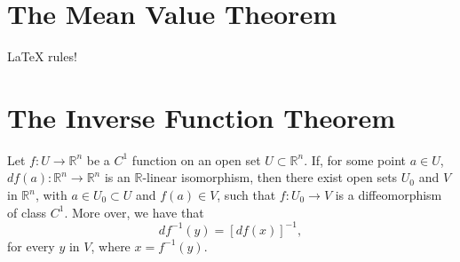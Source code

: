 \section{The Mean Value Theorem}\label{sec:the_mean_value_theorem}

\begin{theorem}\label{thm:the-mean-value-theorem}
  \LaTeX{} rules!
\end{theorem}

\section{The Inverse Function Theorem}\label{sec:the_inverse_function_theorem}

\begin{theorem}\label{thm:the-inverse-function-theorem}
  Let \(f:U\to\mathbb{R}^{n}\) be a \(C^{1}\) function on an open set \({U}\subset{\mathbb{R}^{n}}\). If, for some point \({a}\in{U}\), \(df(a):\mathbb{R}^{n}\to\mathbb{R}^{n}\) is an \(\mathbb{R}\)-linear isomorphism, then there exist open sets \(U_{0}\) and \(V\) in \(\mathbb{R}^{n}\), with \({a}\in{U_{0}}\subset{U}\) and \({f(a)}\in{V}\), such that \(f:U_{0}\to{V}\) is a diffeomorphism of class \(C^{1}\). More over, we have that
  \[
    df^{-1}(y)=[df(x)]^{-1},
  \]
  for every \(y\) in \(V\), where \(x=f^{-1}(y)\).
\end{theorem}


